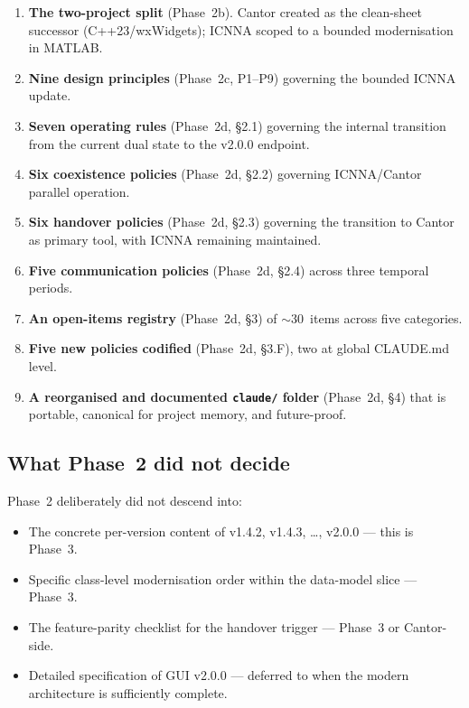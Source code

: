 \documentclass[11pt,a4paper]{article}
\begin{document}
\begin{enumerate}
    \item \textbf{The two-project split} (Phase~2b). Cantor created as the clean-sheet successor (C++23/wxWidgets); ICNNA scoped to a bounded modernisation in MATLAB.
    \item \textbf{Nine design principles} (Phase~2c, P1--P9) governing the bounded ICNNA update.
    \item \textbf{Seven operating rules} (Phase~2d, §2.1) governing the internal transition from the current dual state to the v2.0.0 endpoint.
    \item \textbf{Six coexistence policies} (Phase~2d, §2.2) governing ICNNA/Cantor parallel operation.
    \item \textbf{Six handover policies} (Phase~2d, §2.3) governing the transition to Cantor as primary tool, with ICNNA remaining maintained.
    \item \textbf{Five communication policies} (Phase~2d, §2.4) across three temporal periods.
    \item \textbf{An open-items registry} (Phase~2d, §3) of $\sim$30~items across five categories.
    \item \textbf{Five new policies codified} (Phase~2d, §3.F), two at global CLAUDE.md level.
    \item \textbf{A reorganised and documented \texttt{claude/} folder} (Phase~2d, §4) that is portable, canonical for project memory, and future-proof.
\end{enumerate}

\subsection{What Phase~2 did not decide}

Phase~2 deliberately did not descend into:
\begin{itemize}[nosep]
    \item The concrete per-version content of v1.4.2, v1.4.3, \ldots, v2.0.0 --- this is Phase~3.
    \item Specific class-level modernisation order within the data-model slice --- Phase~3.
    \item The feature-parity checklist for the handover trigger --- Phase~3 or Cantor-side.
    \item Detailed specification of GUI v2.0.0 --- deferred to when the modern architecture is sufficiently complete.
\end{itemize}
\end{document}
